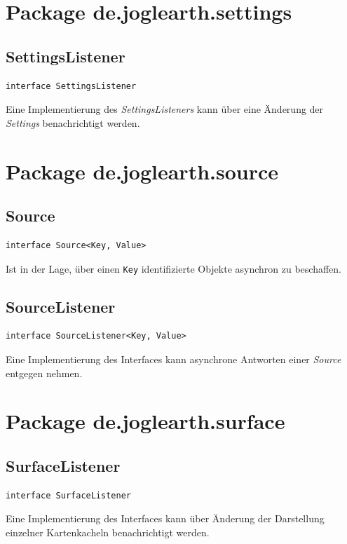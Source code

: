 \documentclass[10pt]{scrreprt}
\begin{document}
\vspace{5mm}
\section{Package de.joglearth.settings}
\subsection*{SettingsListener}
\begin{lstlisting}
interface SettingsListener
\end{lstlisting}
Eine Implementierung des \textit{SettingsListeners} kann über eine Änderung der \textit{Settings} benachrichtigt werden.\\


\vspace{5mm}
\section{Package de.joglearth.source}
\subsection*{Source}
\begin{lstlisting}
interface Source<Key, Value>
\end{lstlisting}
Ist in der Lage, über einen \texttt{Key} identifizierte Objekte asynchron zu beschaffen.\\

\vspace{5mm}
\subsection*{SourceListener}
\begin{lstlisting}
interface SourceListener<Key, Value>
\end{lstlisting}
Eine Implementierung des Interfaces kann asynchrone Antworten einer \textit{Source} entgegen nehmen.\\


\vspace{5mm}
\section{Package de.joglearth.surface}
\subsection*{SurfaceListener}
\begin{lstlisting}
interface SurfaceListener
\end{lstlisting}
Eine Implementierung des Interfaces kann über Änderung der Darstellung einzelner Kartenkacheln benachrichtigt werden.\\
\end{document}
